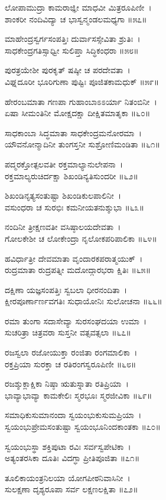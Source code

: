 ಲೋಪಾಮುದ್ರಾ ಕಾಮರಾಜ್ಞೀ ಮಾಧವೀ ಮಿತ್ರರೂಪಿಣೀ~।\\
ಶಾಂಕರೀ ನಂದಿವಿದ್ಯಾ ಚ ಭಾಸ್ವನ್ಮಂಡಲಮಧ್ಯಗಾ ॥೫೭॥

	ಮಾಹೇಂದ್ರಸ್ವರ್ಗಸಂಪತ್ತಿಃ ದುರ್ವಾಸಸ್ಸೇವಿತಾ ಶ್ರುತಿಃ~।\\
	ಸಾಧಕೇಂದ್ರಗತಿಸ್ಸಾಧ್ವೀ ಸುಲಿಪ್ತಾ ಸಿದ್ಧಿಕಂಧರಾ ॥೫೮॥

ಪುರತ್ರಯೇಶೀ ಪುರಕೃತ್ ಷಷ್ಠೀ ಚ ಪರದೇವತಾ~।\\
ವಿಘ್ನದೂರೀ ಭೂರಿಗುಣಾ ಪುಷ್ಟಿಃ ಪೂಜಿತಕಾಮಧುಕ್ ॥೫೯॥

	ಹೇರಂಬಮಾತಾ ಗಣಪಾ ಗುಹಾಂಬಾಽಽರ್ಯಾ ನಿತಂಬಿನೀ~।\\
	ಏಷಾ ಸೀಮಂತಿನೀ ಮೋಕ್ಷದಕ್ಷಾ ದೀಕ್ಷಿತಮಾತೃಕಾ ॥೬೦॥

ಸಾಧಕಾಂಬಾ ಸಿದ್ಧಮಾತಾ ಸಾಧಕೇಂದ್ರಮನೋರಮಾ~।\\
ಯೌವನೋನ್ಮಾದಿನೀ ತುಂಗಸ್ತನೀ ಸುಶ್ರೋಣಿಮಂಡಿತಾ ॥೬೧॥

	ಪದ್ಮರಕ್ತೋತ್ಪಲವತೀ ರಕ್ತಮಾಲ್ಯಾನುಲೇಪನಾ~।\\
	ರಕ್ತಮಾಲ್ಯರುಚಿರ್ದಕ್ಷಾ ಶಿಖಂಡಿನ್ಯತಿಸುಂದರೀ ॥೬೨॥

ಶಿಖಂಡಿನೃತ್ಯಸಂತುಷ್ಟಾ ಶಿಖಂಡಿಕುಲಪಾಲಿನೀ~।\\
ವಸುಂಧರಾ ಚ ಸುರಭಿಃ ಕಮನೀಯತನುಶ್ಶುಭಾ ॥೬೩॥

	ನಂದಿನೀ ತ್ರೀಕ್ಷಣವತೀ ವಸಿಷ್ಠಾಲಯದೇವತಾ~।\\
	ಗೋಲಕೇಶೀ ಚ ಲೋಕೇಂದ್ರಾ ನೃಲೋಕಪರಿಪಾಲಿಕಾ ॥೬೪॥

ಹವಿರ್ಧಾತ್ರೀ ದೇವಮಾತಾ ವೃಂದಾರಕಪರಾತ್ಮಯುಕ್~।\\
ರುದ್ರಮಾತಾ ರುದ್ರಪತ್ನೀ ಮದೋದ್ಗಾರಭರಾ ಕ್ಷಿತಿಃ ॥೬೫॥

	ದಕ್ಷಿಣಾ ಯಜ್ಞಸಂಪತ್ತಿಃ ಸ್ವಬಲಾ ಧೀರನಂದಿತಾ~।\\
	ಕ್ಷೀರಪೂರ್ಣಾರ್ಣವಗತಿಃ ಸುಧಾಯೋನಿಃ ಸುಲೋಚನಾ ॥೬೬॥

ರಮಾ ತುಂಗಾ ಸದಾಸೇವ್ಯಾ ಸುರಸಂಘದಯಾ ಉಮಾ~।\\
ಸುಚರಿತ್ರಾ ಚಿತ್ರವರಾ ಸುಸ್ತನೀ ವತ್ಸವತ್ಸಲಾ ॥೬೭॥

	ರಜಸ್ವಲಾ ರಜೋಯುಕ್ತಾ ರಂಜಿತಾ ರಂಗಮಾಲಿಕಾ~।\\
	ರಕ್ತಪ್ರಿಯಾ ಸುರಕ್ತಾ ಚ ರತಿರಂಗಸ್ವರೂಪಿಣೀ ॥೬೮॥

ರಜಶ್ಶುಕ್ಲಾಕ್ಷಿಕಾ ನಿಷ್ಠಾ ಋತುಸ್ನಾತಾ ರತಿಪ್ರಿಯಾ~।\\
ಭಾವ್ಯಾಭಾವ್ಯಾ ಕಾಮಕೇಲಿಃ ಸ್ಮರಭೂಃ ಸ್ಮರಜೀವಿಕಾ ॥೬೯॥

	ಸಮಾಧಿಕುಸುಮಾನಂದಾ ಸ್ವಯಂಭುಕುಸುಮಪ್ರಿಯಾ~।\\
	ಸ್ವಯಂಭುಪ್ರೇಮಸಂತುಷ್ಟಾ ಸ್ವಯಂಭೂನಿಂದಕಾಂತಕಾ ॥೭೦॥

ಸ್ವಯಂಭುಸ್ಥಾ ಶಕ್ತಿಪುಟಾ ರವಿಃ ಸರ್ವಸ್ವಪೇಟಿಕಾ~।\\
ಅತ್ಯಂತರಸಿಕಾ ದೂತಿಃ ವಿದಗ್ಧಾ ಪ್ರೀತಿಪೂಜಿತಾ ॥೭೧॥

	ತೂಲಿಕಾಯಂತ್ರನಿಲಯಾ ಯೋಗಪೀಠನಿವಾಸಿನೀ~।\\
	ಸುಲಕ್ಷಣಾ ದೃಶ್ಯರೂಪಾ ಸರ್ವ ಲಕ್ಷಣಲಕ್ಷಿತಾ ॥೭೨॥


